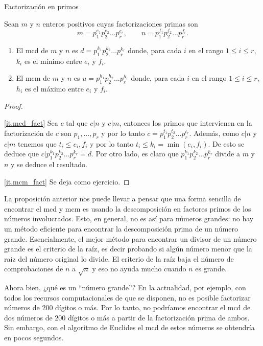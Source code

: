\begin{section}{Factorización en primos}
\begin{proposicion}
Sean $m$ y $n$ enteros positivos cuyas factorizaciones primas son
$$
m=p_1^{e_1}p_2^{e_2}\ldots p_r^{e_r},\qquad
n=p_1^{f_1}p_2^{f_2}\ldots p_r^{f_r}.
$$
\begin{enumerate}[label=\textit{\alph*)}]
    \item\label{it.mcd_fact} El mcd de $m$ y $n$ es $d=p_1^{k_1}p_2^{k_2}\ldots p_r^{k_r}$ donde, para cada $i$ en el rango $1\le i \le r$, $k_i$ es el mínimo entre $e_i$ y $f_i$.
    \item\label{it.mcm_fact} El mcm de $m$ y $n$ es $u=p_1^{h_1}p_2^{h_2}\ldots p_r^{h_r}$ donde, para cada $i$ en el rango $1\le i \le r$, $h_i$ es el máximo entre $e_i$ y $f_i$.
    \end{enumerate}
\end{proposicion}
\begin{proof}
\

\ref{it.mcd_fact} Sea $c$ tal que $c|n$ y $c|m$, entonces los primos que intervienen en la factorización de $c$ son $p_1,\ldots,p_r$ y por lo tanto $c =  p_1^{t_1}p_2^{t_2}\ldots p_r^{t_r}$. Además, como $c|n$ y $c|m$ tenemos que $t_i \le e_i,f_i$ y por lo tanto $t_i \le k_i = \min(e_i,f_i)$. De esto se deduce que $c|p_1^{k_1}p_2^{k_2}\ldots p_r^{k_r}=d$. Por otro lado, es claro  que  $p_1^{k_1}p_2^{k_2}\ldots p_r^{k_r}$ divide a $m$ y $n$ y se deduce el resultado.

\ref{it.mcm_fact}  Se deja como ejercicio. 
\end{proof}


\begin{observacion*} La proposición anterior nos puede llevar a pensar que una forma sencilla de encontrar el mcd y mcm  es usando la descomposición en factores primos de los números involucrados. Esto, en general, no es así para números grandes: no hay un método eficiente para encontrar la descomposición prima de un número grande. Esencialmente, el mejor método para encontrar un divisor de un número grande es el criterio de la raíz, es decir probando si algún número menor que la raíz del número original lo divide. El criterio de la raíz baja el número de comprobaciones de $n$ a $\sqrt{n}$ y eso no ayuda mucho cuando $n$ es grande.

 Ahora bien, ¿qué es un ``número grande''? En la actualidad, por ejemplo, con todos los recursos computacionales de que se disponen, no es posible factorizar números de $200$ dígitos o más. Por lo tanto, no podríamos encontrar el mcd  de dos números de $200$ dígitos o más a partir de la factorización prima de ambos. Sin embargo,  con el algoritmo de Euclides el mcd de estos números se obtendría en pocos segundos.     
\end{observacion*}



\end{section}
